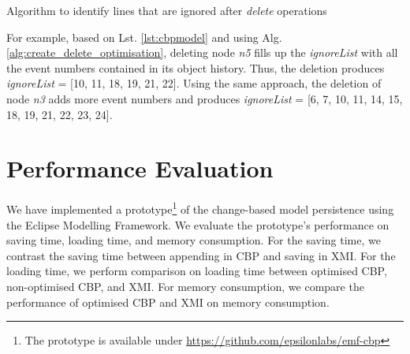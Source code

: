 \documentclass{llncs}
\begin{document}
\begin{algorithm}
\begin{small}
\end{small}
\caption{Algorithm to identify lines that are ignored after \emph{delete} operations}
\label{alg:create_delete_optimisation}
\end{algorithm}

For example, based on Lst. \ref{lst:cbpmodel} and using Alg. \ref{alg:create_delete_optimisation}, deleting node \emph{n5} fills up the \emph{ignoreList} with all the event numbers contained in its object history. Thus, the deletion produces \emph{ignoreList} = [10, 11, 18, 19, 21, 22]. Using the same approach, the deletion of node \emph{n3} adds more event numbers and produces \emph{ignoreList} = [6, 7, 10, 11, 14, 15, 18, 19, 21, 22, 23, 24].

\section{Performance Evaluation}
\label{sec:performance_evaluation}
We have implemented a prototype\footnote{The prototype is available under \url{https://github.com/epsilonlabs/emf-cbp}} of the change-based model persistence using the Eclipse Modelling Framework. We evaluate the prototype's performance on saving time, loading time, and memory consumption. For the saving time, we contrast the saving time between appending in CBP and saving in XMI. For the loading time, we perform comparison on loading time between optimised CBP, non-optimised CBP, and XMI. For memory consumption, we compare the performance of optimised CBP and XMI on memory consumption.
\end{document}

